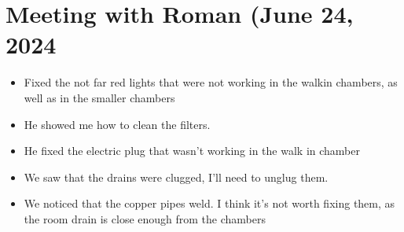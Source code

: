 \documentclass[11pt]{article}
\begin{document}
\section{Meeting with Roman (June 24, 2024}
\begin {itemize}
	\item Fixed the not far red lights that were not working in the walkin chambers, as well as in the smaller chambers
	\item He showed me how to clean the filters. 
	\item He fixed the electric plug that wasn't working in the walk in chamber
	\item We saw that the drains were clugged, I'll need to unglug them.
	\item We noticed that the copper pipes weld. I think it's not worth fixing them, as the room drain is close enough from the chambers
\end {itemize}
\end{document}
